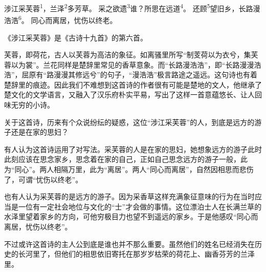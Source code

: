 
\begin{poem}
涉江采芙蓉\textsuperscript{1}，兰泽\textsuperscript{2}多芳草。
采之欲遗\textsuperscript{3}谁？所思在远道\textsuperscript{4}。
还顾\textsuperscript{5}望旧乡，长路漫浩浩\textsuperscript{6}。
同心而离居，忧伤以终老。
\end{poem}

\begin{annotations}
\end{annotations}

\begin{appreciation}
《涉江采芙蓉》是《古诗十九首》的第六首。

芙蓉，即荷花，古人以芙蓉为高洁的象征。如离骚里所写“制芰荷以为衣兮，集芙蓉以为裳”。兰花同样是楚辞里常见的香草意象。而“长路漫浩浩”，即“长路漫漫浩浩”，屈原有“路漫漫其修远兮”的句子，“漫浩浩”极言路途之遥远。这句诗也有着楚辞里的痕迹。因此我们不难想到这首诗的作者很有可能是楚地的文人，他继承了楚文化的文学语言，又融入了汉乐府朴实平易，写出了这样一首意蕴悠长、让人回味无穷的小诗。

关于这首诗，历来有个众说纷纭的疑惑，这位“涉江采芙蓉”的人，到底是远方的游子还是在家的思妇？

有人认为这首诗运用了对写法。采芙蓉的人是在家的思妇，她想象远方的游子此时此刻应该在思念家乡，思念着在家的自己，正如自己思念远方的游子一般，此为“同心”。两人相隔万里，此为“离居”。两人“同心而离居”，自然因相思而悲伤了，可谓“忧伤以终老”。

也有人认为采芙蓉的是远方的游子。因为采香草这样充满象征意味的行为在当时应当是一位有一定社会地位与文化的“士”才会做的事情。这位漂泊士人在长满兰草的水泽里望着家乡的方向，可他穷极目力也望不到遥远的家乡。于是他感叹“同心而离居，忧伤以终老”。

不过或许这首诗的主人公到底是谁也并不那么重要。虽然他们的姓名已经消失在历史的长河里了，但他们的相思依旧寄托在那岁岁枯荣的荷花上、幽香芬芳的兰泽里。
\end{appreciation}
